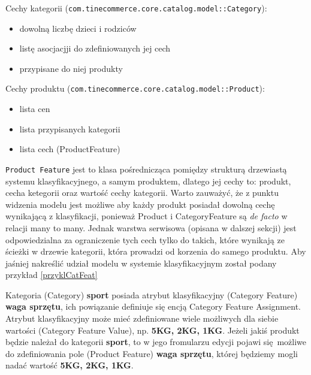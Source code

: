 \noindent Cechy kategorii (\texttt{com.tinecommerce.core.catalog.model::Category}):
\begin{itemize}
	\item dowolną liczbę dzieci i rodziców
	\item listę asocjacjji do zdefiniowanych jej cech
	\item przypisane do niej produkty
\end{itemize} 
Cechy produktu (\texttt{com.tinecommerce.core.catalog.model::Product}):
\begin{itemize}
	\item lista cen
	\item lista przypisanych kategorii
	\item lista cech (ProductFeature)
\end{itemize}
\texttt{Product Feature} jest to klasa pośrednicząca pomiędzy strukturą drzewiastą systemu klasyfikacyjnego, a samym produktem, dlatego jej cechy to: produkt, cecha ketegorii oraz wartość cechy kategorii. Warto zauważyć, że z punktu widzenia modelu jest możliwe aby każdy produkt posiadał dowolną cechę wynikającą z klasyfikacji, ponieważ Product i CategoryFeature są  \textit{de facto} w relacji many to many. Jednak warstwa serwisowa (opisana w dalszej sekcji) jest odpowiedzialna za ograniczenie tych cech tylko do takich, które wynikają ze ścieżki w drzewie kategorii, która prowadzi od korzenia do samego produktu. Aby jaśniej nakreślić udział modelu w systemie klasyfikacyjnym został podany przykład \ref{przyklCatFeat}
\begin{example}
	\label{przyklCatFeat}
	Kategoria (Category) \textbf{sport} posiada atrybut klasyfikacyjny (Category Feature) \textbf{waga sprzętu}, ich powiązanie definiuje się encją Category Feature Assignment. Atrybut klasyfikacyjny może mieć zdefiniowane wiele możliwych dla siebie wartości (Category Feature Value), np. \textbf{5KG, 2KG, 1KG}. Jeżeli jakiś produkt będzie należał do kategorii \textbf{sport}, to w jego fromularzu edycji pojawi się możliwe do zdefiniowania pole (Product Feature) \textbf{waga sprzętu}, której będziemy mogli nadać wartość \textbf{5KG, 2KG, 1KG}.
\end{example}

